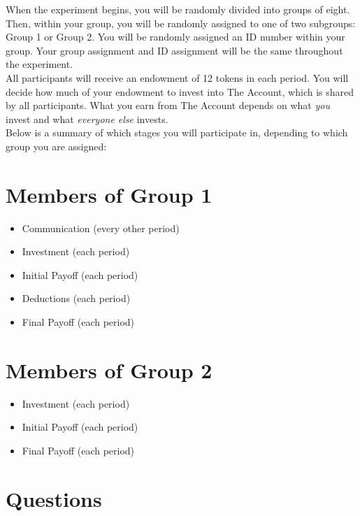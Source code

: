 \documentclass[12pt]{article}
\begin{document}
\iffalse
When the experiment begins, you will be randomly divided into groups of eight.  Then, within your group, you will be randomly assigned to one of two subgroups: Group 1 or Group 2.  You will be randomly assigned an ID number within your group.  Your group assignment and ID assignment will be the same throughout the experiment.\\

All participants will receive an endowment of 12 tokens in each period.  You will decide how much of your endowment to invest into The Account, which is shared by all participants. What you earn from The Account depends on what {\em you} invest and what {\em everyone else} invests.\\  

Below is a summary of which stages you will participate in, depending to which group you are assigned:

\section*{Members of Group 1}

\begin{itemize}
\item Communication (every other period)
\item Investment (each period)
\item Initial Payoff (each period)
\item Deductions (each period)
\item Final Payoff (each period)
\end{itemize}

\section*{Members of Group 2}

\begin{itemize}
\item Investment (each period)
\item Initial Payoff (each period)
\item Final Payoff (each period)
\end{itemize}


\section*{Questions}
\end{document}
